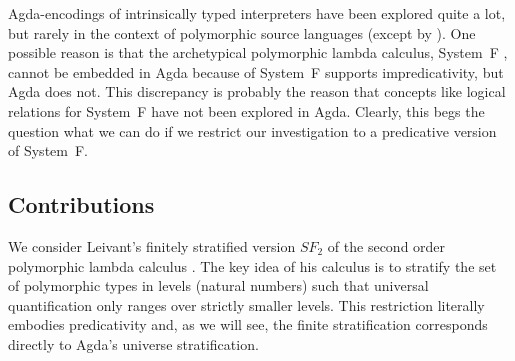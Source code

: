 \documentclass[sigplan,anonymous,review,screen]{acmart}
\begin{document}
Agda-encodings of intrinsically typed interpreters have been explored
quite a lot, but rarely in the context of polymorphic source
languages (except by \citet{DBLP:conf/mpc/ChapmanKNW19}). One possible
reason is that the archetypical polymorphic 
lambda calculus, System~F \cite{girard72:_inter,DBLP:conf/programm/Reynolds74}, cannot be embedded in Agda because of
System~F supports impredicativity, but Agda does not. This discrepancy
is probably the reason that concepts like logical relations for System~F
have not been explored in Agda.
Clearly, this begs the question what we can do if we restrict our
investigation to a predicative version of System~F.

\subsection*{Contributions}
\label{sec:contributions}

We consider Leivant's finitely stratified version $SF_2$ of the second
order polymorphic
lambda calculus \cite{DBLP:journals/iandc/Leivant91}. The key idea of
his calculus is to stratify the set of polymorphic types in levels
(natural numbers) such that universal quantification only ranges over
strictly smaller levels. This restriction literally embodies predicativity and, as we
will see, the finite stratification corresponds directly to Agda's
universe stratification.
\end{document}
